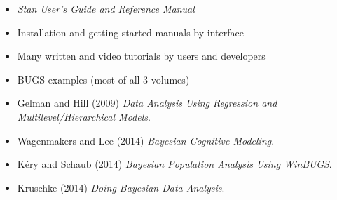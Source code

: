 \documentclass[10pt]{report}
\begin{document}
%
\begin{itemize}
\item {\slshape Stan User's Guide and Reference Manual}
\item Installation and getting started manuals by interface
\item Many written and video tutorials by users and developers
\end{itemize}


%
\begin{itemize}
\item BUGS examples (most of all 3 volumes)
\item Gelman and Hill (2009) {\slshape Data Analysis Using Regression and
    Multilevel/Hierarchical Models}.
\item Wagenmakers and Lee (2014) {\slshape Bayesian Cognitive
    Modeling}.
\item K\'ery and Schaub (2014) {\slshape Bayesian Population Analysis
    Using WinBUGS}.
\item Kruschke (2014) {\slshape Doing Bayesian Data Analysis}.
\end{itemize}
\end{document}
